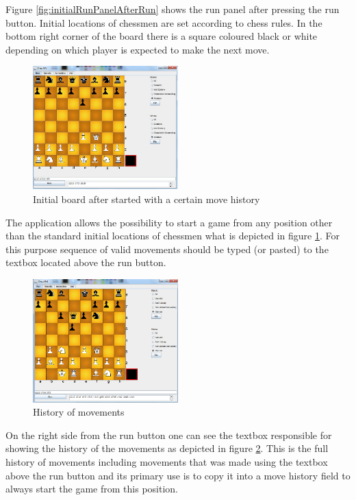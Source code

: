 \documentclass[pdftex]{article}
\begin{document}
Figure \ref{fig:initialRunPanelAfterRun} shows the run panel after pressing the run button. Initial locations of chessmen are set according to chess rules. In the bottom right corner of the board there is a square coloured black or white depending on which player is expected to make the next move.

\begin{figure}[!htb]
	\centering
	\includegraphics[width=0.5\textwidth]{chessImages/withHistory.png} 
	\caption{Initial board after started with a certain move history}
	\label{fig:runPanelWithHistory}
\end{figure}

The application allows the possibility to start a game from any position other than the standard initial locations of chessmen what is depicted in figure \ref{fig:runPanelWithHistory}. For this purpose sequence of valid movements should be typed (or pasted) to the textbox located above the run button.

\begin{figure}[!htb]
	\centering
	\includegraphics[width=0.5\textwidth]{chessImages/withHistoryAndGameHistory.png} 
	\caption{History of movements}
	\label{fig:runPanelWithMovementsHistory}
\end{figure}

On the right side from the run button one can see the textbox responsible for showing the history of the movements as depicted in figure \ref{fig:runPanelWithMovementsHistory}. This is the full history of movements including movements that was made using the textbox above the run button and its primary use is to copy it into a move history field to always start the game from this position.
\end{document}

